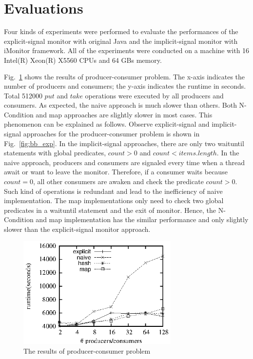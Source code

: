 \documentclass[preprint]{sigplanconf}
\begin{document}
\section{Evaluations} \label{sec:eval}
Four kinds of experiments were performed to evaluate the performances of the
explicit-signal monitor with original Java and the implicit-signal monitor with
iMonitor framework. All of the experiments were conducted on a machine with 16 
Intel(R) Xeon(R) X5560 CPUs and 64 GBs memory. 


Fig.~\ref{fig:pc_eval} shows the results of producer-consumer problem. The
x-axis indicates the number of producers and consumers; the y-axis indicates the
runtime in seconds. Total 512000 $put$ and $take$ operations were executed by
all producers and consumers. As expected, the naive approach is much slower than
others. Both N-Condition and map approaches are slightly slower in most cases.
This phenomenon can be explained as follows. Observe explicit-signal and 
implicit-signal approaches for the producer-consumer problem is shown in 
Fig.~\ref{fig:bb_exp}. In the implicit-signal approaches, there are only two 
waituntil statements with global predicates, $count > 0$ and 
$count < items.length$. In the naive approach, producers and consumers are
signaled every time when a thread await or want to leave the monitor. Therefore,
if a consumer waits because $count = 0$, all other consumers are awaken and
check the predicate $count > 0$. Such kind of operations is redundant and lead
to the inefficiency of naive implementation. The map
implementations only need to check two global predicates in a waituntil
statement and the exit of monitor. Hence, the N-Condition and map implementation 
has the similar performance and only slightly slower than the explicit-signal
monitor approach. 
\begin{figure}[ht!]
  \centering
  \includegraphics[width=80mm]{fig/pc.eps}
  \caption{The results of producer-consumer problem}
  \label{fig:pc_eval}
\end{figure}
\end{document}
